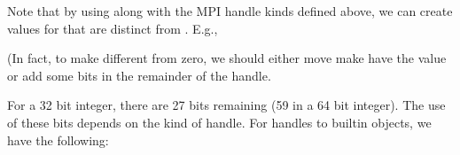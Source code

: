 \documentclass{article}
\begin{document}
Note that by using  along with the MPI handle
kinds defined above, we can create values for  that
are distinct from .  E.g., 
\begin{description}
\item[]       
\item[]      
\item[]       
\item[]       
\item[] 
\item[]         
\item[]       
\item[]        
\item[]  
\end{description}
(In fact, to make  different from zero, we should
either move make  have the value  or add
some bits in the remainder of the handle.

For a 32 bit integer, there are 27 bits remaining (59 in a 64 bit integer).
The use of these bits depends on the kind of handle.  For handles to
builtin objects, we have the following:
\end{document}
